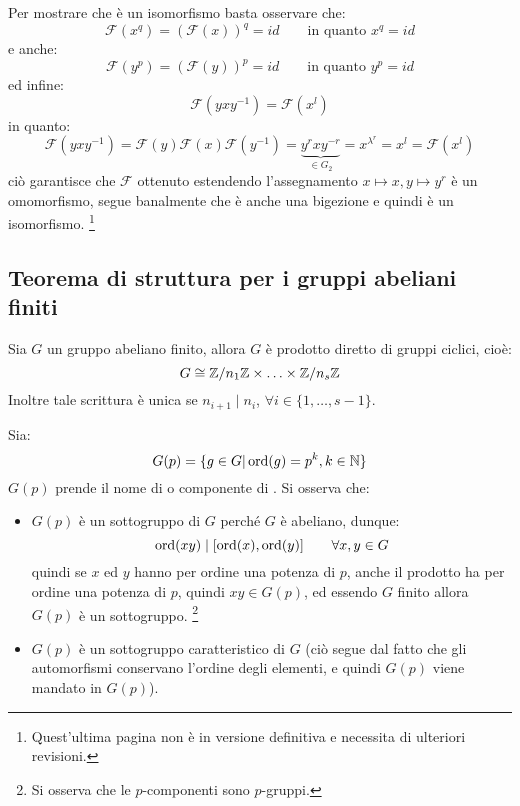 \documentclass[11pt]{scrartcl}
\begin{document}
Per mostrare che è un isomorfismo basta osservare che:
    \[ \mathcal{F}(x^q) = (\mathcal{F}(x))^q = id \qquad \text{in quanto $x^q = id$}
        \]
e anche:
    \[ \mathcal{F}(y^p) = (\mathcal{F}(y))^p = id \qquad \text{in quanto $y^p = id$}
        \]
ed infine:
    \[ \mathcal{F}(yxy^{-1}) = \mathcal{F}(x^l)
        \]
in quanto:
    \[ \mathcal{F}(yxy^{-1}) = \mathcal{F}(y) \mathcal{F}(x) \mathcal{F}(y^{-1}) = \underbrace{y^rxy^{-r}}_{\in G_2} = x^{\lambda^{r}} = x^l = \mathcal{F}(x^l)
        \]
ciò garantisce che $\mathcal{F}$ ottenuto estendendo l'assegnamento $x \longmapsto x, y \longmapsto y^r$ è un omomorfismo, segue banalmente che è anche una bigezione e quindi è un isomorfismo. \footnote{Quest'ultima pagina non è in versione 
definitiva e necessita di ulteriori revisioni.}

\newpage
\subsection{Teorema di struttura per i gruppi abeliani finiti}

\begin{theorem}
    \label{t:struttura}
    Sia $G$ un gruppo abeliano finito, allora $G$ è prodotto diretto di gruppi ciclici, cioè:
        \[ G \cong \mathbb{Z}/{n_1}\mathbb{Z} \times \ldots \times \mathbb{Z}/{n_s}\mathbb{Z}
            \]
    Inoltre tale scrittura è unica se $n_{i+1} \mid n_i$, $\forall i \in \{1,\ldots,s-1\}$.
\end{theorem}

\begin{remark}
    Sia:
        \[ G(p) = \{g \in G | \operatorname{ord}(g) = p^k, k \in \mathbb N\}
            \]
    $G(p)$ prende il nome di  o componente di .
    Si osserva che:
        \begin{itemize}
            \item $G(p)$ è un sottogruppo di $G$ perché $G$ è abeliano, dunque:
                \[ \operatorname{ord}(xy) \mid [\operatorname{ord}(x),\operatorname{ord}(y)] \qquad \forall x,y \in G
                    \]
                quindi se $x$ ed $y$ hanno per ordine una potenza di $p$, anche il prodotto ha per ordine una potenza di $p$, quindi $xy \in G(p)$, ed essendo 
                $G$ finito allora $G(p)$ è un sottogruppo. \footnote{Si osserva che le $p$-componenti sono $p$-gruppi.}
            \item $G(p)$ è un sottogruppo caratteristico di $G$ (ciò segue dal fatto che gli automorfismi conservano l'ordine degli elementi, e quindi $G(p)$ viene mandato in $G(p)$).
        \end{itemize}
\end{remark}
\end{document}
